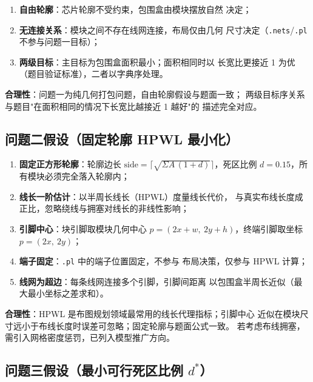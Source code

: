 \documentclass[12pt,a4paper]{article}
\begin{document}
\begin{enumerate}[leftmargin=2em]
    \item \textbf{自由轮廓}：芯片轮廓不受约束，包围盒由模块摆放自然
    决定；
    \item \textbf{无连接关系}：模块之间不存在线网连接，布局仅由几何
    尺寸决定（\texttt{.nets}/\texttt{.pl} 不参与问题一目标）；
    \item \textbf{两级目标}：主目标为包围盒面积最小；面积相同时以
    长宽比更接近 1 为优（题目验证标准），二者以字典序处理。
\end{enumerate}

\textbf{合理性}：问题一为纯几何打包问题，自由轮廓假设与题面一致；
两级目标序关系与题目"在面积相同的情况下长宽比越接近 1 越好"的
描述完全对应。

\subsection{问题二假设（固定轮廓 HPWL 最小化）}

\begin{enumerate}[leftmargin=2em]
    \item \textbf{固定正方形轮廓}：轮廓边长
    $\text{side} = \lceil\sqrt{\Sigma A\,(1+d)}\rceil$，死区比例
    $d = 0.15$，所有模块必须完全落入轮廓内；
    \item \textbf{线长一阶估计}：以半周长线长（HPWL）度量线长代价，
    与真实布线长度成正比，忽略绕线与拥塞对线长的非线性影响；
    \item \textbf{引脚中心}：块引脚取模块几何中心
    $p = (2x + w,\ 2y + h)$，终端引脚取坐标 $p = (2x,\ 2y)$；
    \item \textbf{端子固定}：\texttt{.pl} 中的端子位置固定，不参与
    布局决策，仅参与 HPWL 计算；
    \item \textbf{线网为超边}：每条线网连接多个引脚，引脚间距离
    以包围盒半周长近似（最大最小坐标之差求和）。
\end{enumerate}

\textbf{合理性}：HPWL 是布图规划领域最常用的线长代理指标；引脚中心
近似在模块尺寸远小于布线长度时误差可忽略；固定轮廓与题面公式一致。
若考虑布线拥塞，需引入网格密度惩罚，已列入模型推广方向。

\subsection{问题三假设（最小可行死区比例 $d^*$）}
\end{document}
